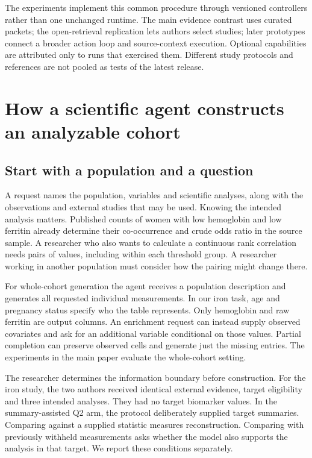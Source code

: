 \documentclass[11pt,letterpaper]{article}
\begin{document}
The experiments implement this common procedure through versioned controllers rather than one unchanged runtime. The main evidence contrast uses curated packets; the open-retrieval replication lets authors select studies; later prototypes connect a broader action loop and source-context execution. Optional capabilities are attributed only to runs that exercised them. Different study protocols and references are not pooled as tests of the latest release.


\section{How a scientific agent constructs an analyzable cohort}

\subsection{Start with a population and a question}

A request names the population, variables and scientific analyses, along with the observations and external studies that may be used. Knowing the intended analysis matters. Published counts of women with low hemoglobin and low ferritin already determine their co-occurrence and crude odds ratio in the source sample. A researcher who also wants to calculate a continuous rank correlation needs pairs of values, including within each threshold group. A researcher working in another population must consider how the pairing might change there.


For whole-cohort generation the agent receives a population description and generates all requested individual measurements. In our iron task, age and pregnancy status specify who the table represents. Only hemoglobin and raw ferritin are output columns. An enrichment request can instead supply observed covariates and ask for an additional variable conditional on those values. Partial completion can preserve observed cells and generate just the missing entries. The experiments in the main paper evaluate the whole-cohort setting.


The researcher determines the information boundary before construction. For the iron study, the two authors received identical external evidence, target eligibility and three intended analyses. They had no target biomarker values. In the summary-assisted Q2 arm, the protocol deliberately supplied target summaries. Comparing against a supplied statistic measures reconstruction. Comparing with previously withheld measurements asks whether the model also supports the analysis in that target. We report these conditions separately.
\end{document}
